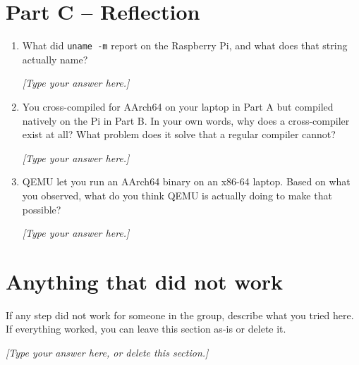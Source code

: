 \documentclass[11pt]{article}
\begin{document}
\section{Part C -- Reflection}
\begin{enumerate}
  \item What did \texttt{uname -m} report on the Raspberry Pi, and what does
        that string actually name?

        \textit{[Type your answer here.]}
  \item You cross-compiled for AArch64 on your laptop in Part A but compiled
        natively on the Pi in Part B. In your own words, why does a
        cross-compiler exist at all? What problem does it solve that a
        regular compiler cannot?

        \textit{[Type your answer here.]}
  \item QEMU let you run an AArch64 binary on an x86-64 laptop. Based on what
        you observed, what do you think QEMU is actually doing to make that
        possible?

        \textit{[Type your answer here.]}
\end{enumerate}

\section*{Anything that did not work}
If any step did not work for someone in the group, describe what you tried
here. If everything worked, you can leave this section as-is or delete it.

\textit{[Type your answer here, or delete this section.]}
\end{document}
